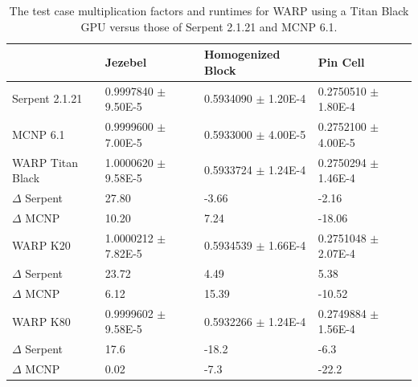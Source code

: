 \documentclass[preprint,12pt]{elsarticle}
\begin{document}
\begin{table}[h]
\centering
\caption{The test case multiplication factors and runtimes for WARP using a Titan Black GPU versus those of Serpent 2.1.21 and MCNP 6.1.}
\label{results_table_keff}
\footnotesize
\begin{tabular}{| l | l | l | l |}
\cline{2-4}
\multicolumn{1}{c|}{}               & Jezebel                 &  Homogenized Block      & Pin Cell                  \\
\hline
Serpent 2.1.21                      & 0.9997840 $\pm$ 9.50E-5 & 0.5934090 $\pm$ 1.20E-4 & 0.2750510 $\pm$ 1.80E-4   \\
\hline
MCNP 6.1                            & 0.9999600 $\pm$ 7.00E-5 & 0.5933000 $\pm$ 4.00E-5 & 0.2752100 $\pm$ 4.00E-5   \\
\hline
WARP Titan Black                    & 1.0000620 $\pm$ 9.58E-5 & 0.5933724 $\pm$ 1.24E-4 & 0.2750294 $\pm$ 1.46E-4   \\
    \qquad\qquad   $\Delta$ Serpent & 27.80                   & -3.66                   &  -2.16                    \\
    \qquad\qquad   $\Delta$ MCNP    & 10.20                   &  7.24                   & -18.06                    \\
\hline
WARP K20                            & 1.0000212 $\pm$ 7.82E-5 & 0.5934539 $\pm$ 1.66E-4 & 0.2751048 $\pm$ 2.07E-4   \\
    \qquad\qquad   $\Delta$ Serpent & 23.72                   & 4.49                    &   5.38                    \\
    \qquad\qquad   $\Delta$ MCNP    &  6.12                   & 15.39                   & -10.52                    \\
\hline
WARP K80                            & 0.9999602 $\pm$ 9.58E-5 & 0.5932266 $\pm$ 1.24E-4 & 0.2749884 $\pm$ 1.56E-4   \\
    \qquad\qquad   $\Delta$ Serpent & 17.6                    & -18.2                   &  -6.3                     \\
    \qquad\qquad   $\Delta$ MCNP    &  0.02                   &  -7.3                   & -22.2                     \\
\hline
\end{tabular}

\smallskip


\end{table}
\end{document}
